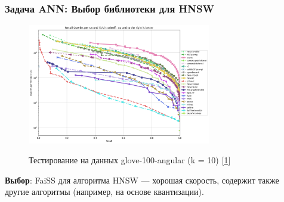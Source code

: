 \documentclass{beamer}
\begin{document}
\begin{frame}

\frametitle{Задача ANN: Выбор библиотеки для HNSW}

\begin{figure}
\centering
\includegraphics[width=8cm]{img/glove-100-angular_10_angular.png}

Тестирование на данных glove-100-angular (k = 10) [\href{ann-benchmark.com}{\color{blue}1}]
\end{figure}

\textbf{Выбор}: FaiSS для алгоритма HNSW --- хорошая скорость, содержит также другие алгоритмы (например, на основе квантизации).


\end{frame}
\end{document}
